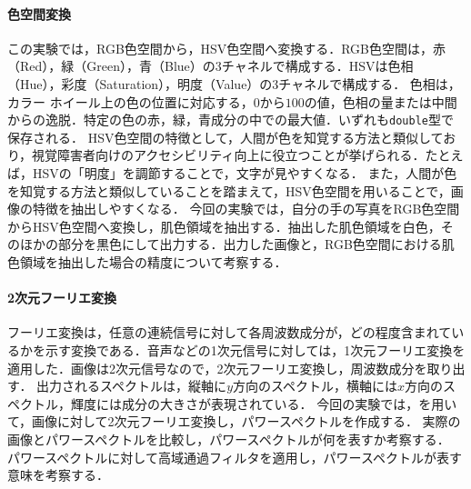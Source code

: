 \paragraph{色空間変換}この実験では，RGB色空間から，HSV色空間へ変換する．RGB色空間は，赤（Red），緑（Green），青（Blue）の3チャネルで構成する．HSVは色相（Hue），彩度（Saturation），明度（Value）の3チャネルで構成する．
色相は，カラー ホイール上の色の位置に対応する，\(0\)から\(100\)の値，色相の量または中間からの逸脱．特定の色の赤，緑，青成分の中での最大値．いずれも\texttt{double}型で保存される\cite{rgb2hsv}．
HSV色空間の特徴として，人間が色を知覚する方法と類似しており，視覚障害者向けのアクセシビリティ向上に役立つことが挙げられる．たとえば，HSVの「明度」を調節することで，文字が見やすくなる\cite[p.97\ -\ p.98]{画像処理}．
また，人間が色を知覚する方法と類似していることを踏まえて，HSV色空間を用いることで，画像の特徴を抽出しやすくなる．
今回の実験では，自分の手の写真をRGB色空間からHSV色空間へ変換し，肌色領域を抽出する．抽出した肌色領域を白色，そのほかの部分を黒色にして出力する．出力した画像と，RGB色空間における肌色領域を抽出した場合の精度について考察する．
\paragraph{2次元フーリエ変換}
フーリエ変換は，任意の連続信号に対して各周波数成分が，どの程度含まれているかを示す変換である．音声などの1次元信号に対しては，1次元フーリエ変換を適用した．画像は2次元信号なので，2次元フーリエ変換し，周波数成分を取り出す．
出力されるスペクトルは，縦軸に\(y\)方向のスペクトル，横軸には\(x\)方向のスペクトル，輝度には成分の大きさが表現されている．
今回の実験では，\matlab を用いて，画像に対して2次元フーリエ変換し，パワースペクトルを作成する．
実際の画像とパワースペクトルを比較し，パワースペクトルが何を表すか考察する．
パワースペクトルに対して高域通過フィルタを適用し，パワースペクトルが表す意味を考察する．